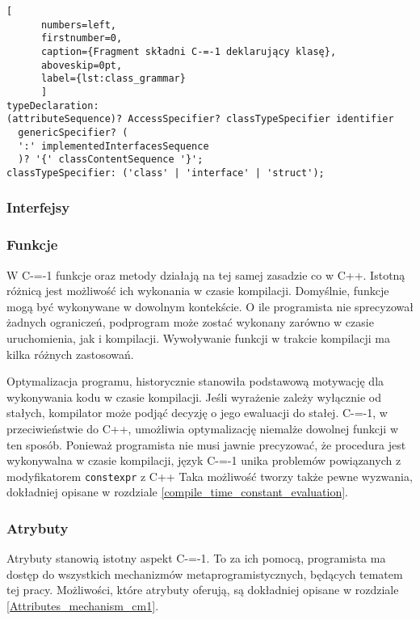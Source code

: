\begin{minipage}{\linewidth}
  
	\begin{lstlisting}[
	  numbers=left,
	  firstnumber=0,
	  caption={Fragment składni C-=-1 deklarujący klasę},
	  aboveskip=0pt,
	  label={lst:class_grammar}
	  ]
typeDeclaration:
(attributeSequence)? AccessSpecifier? classTypeSpecifier identifier 
  genericSpecifier? (
  ':' implementedInterfacesSequence
  )? '{' classContentSequence '}';
classTypeSpecifier: ('class' | 'interface' | 'struct');
  \end{lstlisting}
  \end{minipage}

\subsubsection{Interfejsy}
\subsubsection{Funkcje}
W C-=-1 funkcje oraz metody działają na tej samej zasadzie co w C++.
Istotną różnicą jest możliwość ich wykonania w czasie kompilacji.
Domyślnie, funkcje mogą być wykonywane w dowolnym kontekście.
O ile programista nie sprecyzował żadnych ograniczeń, podprogram może zostać wykonany zarówno w czasie uruchomienia, jak i kompilacji.
Wywoływanie funkcji w trakcie kompilacji ma kilka różnych zastosowań.

Optymalizacja programu, historycznie stanowiła podstawową motywację dla wykonywania kodu w czasie kompilacji.
Jeśli wyrażenie zależy wyłącznie od stałych, kompilator może podjąć decyzję o jego ewaluacji do stałej.
C-=-1, w przeciwieństwie do C++, umożliwia optymalizację niemalże dowolnej funkcji w ten sposób.
Ponieważ programista nie musi jawnie precyzować, że procedura jest wykonywalna w czasie kompilacji, język C-=-1 unika problemów powiązanych z modyfikatorem \lstinline{constexpr} z C++ \cite{Klimiankou:contexpr_great_good_wrong_idea}
Taka możliwość tworzy także pewne wyzwania, dokładniej opisane w rozdziale \ref{compile_time_constant_evaluation}.

\subsubsection{Atrybuty}
\label{Attributes_definition}

Atrybuty stanowią istotny aspekt C-=-1.
To za ich pomocą, programista ma dostęp do wszystkich mechanizmów metaprogramistycznych, będących tematem tej pracy.
Możliwości, które atrybuty oferują, są dokładniej opisane w rozdziale \ref{Attributes_mechanism_cm1}.

